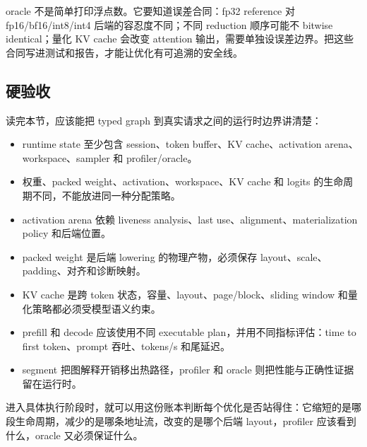 oracle 不是简单打印浮点数。它要知道误差合同：fp32 reference 对 fp16/bf16/int8/int4 后端的容忍度不同；不同 reduction 顺序可能不 bitwise identical；量化 KV cache 会改变 attention 输出，需要单独设误差边界。把这些合同写进测试和报告，才能让优化有可追溯的安全线。

\subsection{硬验收}

读完本节，应该能把 typed graph 到真实请求之间的运行时边界讲清楚：

\begin{itemize}
  \item runtime state 至少包含 session、token buffer、KV cache、activation arena、workspace、sampler 和 profiler/oracle。
  \item 权重、packed weight、activation、workspace、KV cache 和 logits 的生命周期不同，不能放进同一种分配策略。
  \item activation arena 依赖 liveness analysis、last use、alignment、materialization policy 和后端位置。
  \item packed weight 是后端 lowering 的物理产物，必须保存 layout、scale、padding、对齐和诊断映射。
  \item KV cache 是跨 token 状态，容量、layout、page/block、sliding window 和量化策略都必须受模型语义约束。
  \item prefill 和 decode 应该使用不同 executable plan，并用不同指标评估：time to first token、prompt 吞吐、tokens/s 和尾延迟。
  \item segment 把图解释开销移出热路径，profiler 和 oracle 则把性能与正确性证据留在运行时。
\end{itemize}

进入具体执行阶段时，就可以用这份账本判断每个优化是否站得住：它缩短的是哪段生命周期，减少的是哪条地址流，改变的是哪个后端 layout，profiler 应该看到什么，oracle 又必须保证什么。

